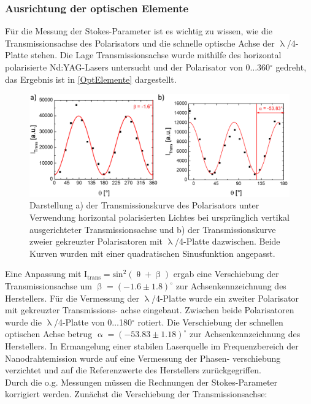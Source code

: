 \subsubsection{Ausrichtung der optischen Elemente}
\label{AusrOptEl}
Für die Messung der Stokes-Parameter ist es wichtig zu wissen, wie die Transmissionsachse des Polarisators und die schnelle optische Achse der $\uplambda$/4-Platte stehen. Die Lage Transmissionsachse wurde mithilfe des horizontal polarisierte Nd:YAG-Lasers untersucht und der Polarisator von 0$\ldots $360$^\circ$ gedreht, das Ergebnis ist in \autoref{OptElemente} dargestellt.\begin{figure}[b]
\includegraphics[width=1\textwidth]{Bilder/Methodik/OptElemente}
\caption{Darstellung a) der Transmissionskurve des Polarisators unter Verwendung horizontal polarisierten Lichtes bei ursprünglich vertikal ausgerichteter Transmissionsachse und b) der Transmissionskurve zweier gekreuzter Polarisatoren mit $\uplambda$/4-Platte dazwischen. Beide Kurven wurden mit einer quadratischen Sinusfunktion angepasst.}
\label{OptElemente}
\end{figure}Eine Anpassung mit $\text{I}_\text{trans}=\text{sin}^2(\uptheta+ \upbeta)$ ergab eine Verschiebung der Transmissionsachse um $\upbeta=(-\text{1.6}\pm \text{1.8})^\circ$ zur Achsenkennzeichnung des Herstellers. Für die Vermessung der $\uplambda$/4-Platte wurde ein zweiter Polarisator mit gekreuzter Transmissions- achse eingebaut. Zwischen beide Polarisatoren wurde die $\uplambda$/4-Platte von 0$\ldots $180$^\circ$ rotiert. Die Verschiebung der schnellen optischen Achse betrug $\upalpha=(-\text{53.83}\pm\text{1.18})^\circ$ zur Achsenkennzeichnung des Herstellers.
In Ermangelung einer stabilen Laserquelle im Frequenzbereich der Nanodrahtemission wurde auf eine Vermessung der Phasen- verschiebung verzichtet und auf die Referenzwerte des Herstellers zurückgegriffen.\\
Durch die o.g. Messungen müssen die Rechnungen der Stokes-Parameter korrigiert werden. Zunächst die Verschiebung der Transmissionsachse:
